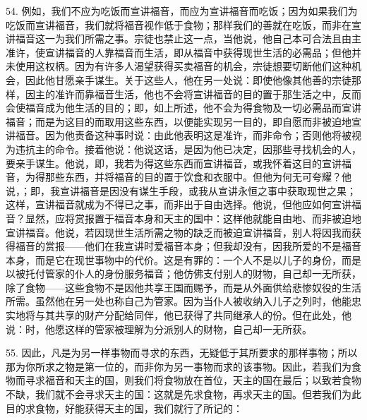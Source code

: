 54. 例如，我们不应为吃饭而宣讲福音，而应为宣讲福音而吃饭；因为如果我们为吃饭而宣讲福音，我们就将福音视作低于食物；那样我们的善就在吃饭，而非在宣讲福音这一为我们所需之事。宗徒也禁止这一点，当他说，他自己本可合法且由主准许，使宣讲福音的人靠福音而生活，即从福音中获得现世生活的必需品；但他并未使用这权柄。因为有许多人渴望获得买卖福音的机会，宗徒想要切断他们这种机会，因此他甘愿亲手谋生。关于这些人，他在另一处说：即使他像其他善的宗徒那样，因主的准许而靠福音生活，他也不会将宣讲福音的目的置于那生活之中，反而会使福音成为他生活的目的；即，如上所述，他不会为得食物及一切必需品而宣讲福音；而是为这目的而取用这些东西，以便能实现另一目的，即自愿而非被迫地宣讲福音。因为他责备这种事时说：由此他表明这是准许，而非命令；否则他将被视为违抗主的命令。接着他说：他说这话，是因为他已决定，因那些寻找机会的人，要亲手谋生。他说，即，我若为得这些东西而宣讲福音，或我怀着这目的宣讲福音，为得那些东西，并将福音的目的置于饮食和衣服中。但他为何无可夸耀？他说，；即，我宣讲福音是因没有谋生手段，或我从宣讲永恒之事中获取现世之果；这样，宣讲福音就成为不得已之事，而非出于自由选择。他说，但他应如何宣讲福音？显然，应将赏报置于福音本身和天主的国中：这样他就能自由地、而非被迫地宣讲福音。他说，若因现世生活所需之物的缺乏而被迫宣讲福音，别人将因我而获得福音的赏报——他们在我宣讲时爱福音本身；但我却没有，因我所爱的不是福音本身，而是它在现世事物中的代价。这是有罪的：一个人不是以儿子的身份，而是以被托付管家的仆人的身份服务福音；他仿佛支付别人的财物，自己却一无所获，除了食物——这些食物不是因他共享王国而赐予，而是从外面供给悲惨奴役的生活所需。虽然他在另一处也称自己为管家。因为当仆人被收纳入儿子之列时，他能忠实地将与其共享的财产分配给同伴，他已获得了共同继承人的份。但在此处，他说：时，他愿这样的管家被理解为分派别人的财物，自己却一无所获。\par

55. 因此，凡是为另一样事物而寻求的东西，无疑低于其所要求的那样事物；所以那为你所求之物是第一位的，而非你为另一事物而求的该事物。因此，若我们为食物而寻求福音和天主的国，则我们将食物放在首位，天主的国在最后；以致若食物不缺，我们就不会寻求天主的国：这就是先求食物，再求天主的国。但若我们为此目的求食物，好能获得天主的国，我们就行了所记的：\par


